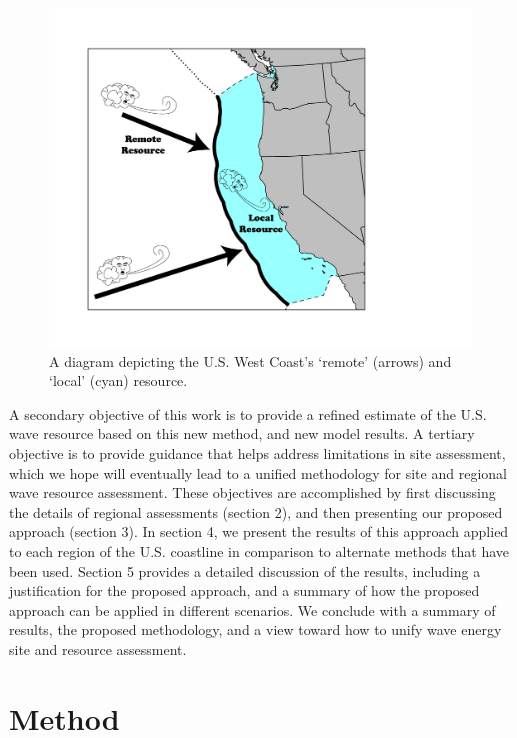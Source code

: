 \documentclass{elsarticle}
\begin{document}
\begin{figure}[ht]
  \centering
\includegraphics[width=0.9\linewidth]{../diagram/EEZ_contour03_edit01.png}
  \caption{A diagram depicting the U.S. West Coast’s ‘remote’ (arrows) and ‘local’ (cyan) resource.}
  \label{fig:map01}
\end{figure}

A secondary objective of this work is to provide a refined estimate of the U.S. wave resource based on this new method, and new model results. A tertiary objective is to provide guidance that helps address limitations in site assessment, which we hope will eventually lead to a unified methodology for site and regional wave resource assessment.
These objectives are accomplished by first discussing the details of regional assessments (section 2), and then presenting our proposed approach (section 3). In section 4, we present the results of this approach applied to each region of the U.S. coastline in comparison to alternate methods that have been used. Section 5 provides a detailed discussion of the results, including a justification for the proposed approach, and a summary of how the proposed approach can be applied in different scenarios. We conclude with a summary of results, the proposed methodology, and a view toward how to unify wave energy site and resource assessment.

\section{Method}

\clearpage



\end{document}
